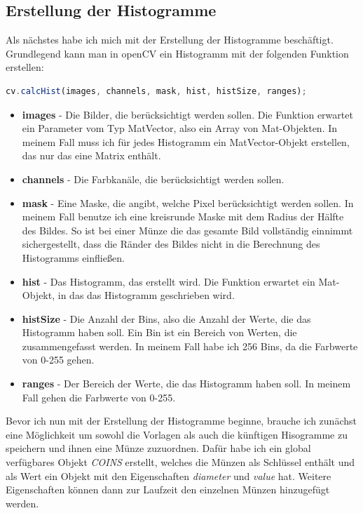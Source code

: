 \subsection{Erstellung der Histogramme}
Als nächstes habe ich mich mit der Erstellung der Histogramme beschäftigt. Grundlegend kann man in openCV ein Histogramm mit der folgenden Funktion erstellen:

\begin{lstlisting}[language=JavaScript]
cv.calcHist(images, channels, mask, hist, histSize, ranges);
\end{lstlisting}

\begin{itemize}
    \item \textbf{images} - Die Bilder, die berücksichtigt werden sollen. Die Funktion erwartet ein Parameter vom Typ MatVector, also ein Array von Mat-Objekten. In meinem Fall muss ich für jedes Histogramm ein MatVector-Objekt erstellen, das nur das eine Matrix enthält.
    \item \textbf{channels} - Die Farbkanäle, die berücksichtigt werden sollen.
    \item \textbf{mask} - Eine Maske, die angibt, welche Pixel berücksichtigt werden sollen. In meinem Fall benutze ich eine kreisrunde Maske mit dem Radius der Hälfte des Bildes. So ist bei einer Münze die das gesamte Bild vollständig einnimmt sichergestellt, dass die Ränder des Bildes nicht in die Berechnung des Histogramms einfließen.
    \item \textbf{hist} - Das Histogramm, das erstellt wird. Die Funktion erwartet ein Mat-Objekt, in das das Histogramm geschrieben wird.
    \item \textbf{histSize} - Die Anzahl der Bins, also die Anzahl der Werte, die das Histogramm haben soll. Ein Bin ist ein Bereich von Werten, die zusammengefasst werden. In meinem Fall habe ich 256 Bins, da die Farbwerte von 0-255 gehen.
    \item \textbf{ranges} - Der Bereich der Werte, die das Histogramm haben soll. In meinem Fall gehen die Farbwerte von 0-255.
\end{itemize}

Bevor ich nun mit der Erstellung der Histogramme beginne, brauche ich zunächst eine Möglichkeit um sowohl die Vorlagen als auch die künftigen Hisogramme zu speichern und ihnen eine Münze zuzuordnen. Dafür habe ich ein global verfügbares Objekt \textit{COINS} erstellt, welches die Münzen als Schlüssel enthält und als Wert ein Objekt mit den Eigenschaften \textit{diameter} und \textit{value} hat. Weitere Eigenschaften können dann zur Laufzeit den einzelnen Münzen hinzugefügt werden.

